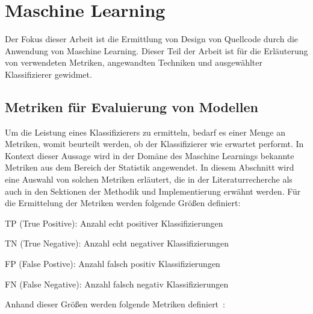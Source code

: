 \section{Maschine Learning}

Der Fokus dieser Arbeit ist die Ermittlung von Design von Quellcode durch die Anwendung von Maschine Learning.
Dieser Teil der Arbeit ist für die Erläuterung von verwendeten Metriken, angewandten Techniken und ausgewählter Klassifizierer gewidmet.

\subsection{Metriken für Evaluierung von Modellen}\label{metrics}

Um die Leistung eines Klassifizierers zu ermitteln, bedarf es einer Menge an Metriken, womit beurteilt werden, ob der Klassifizierer wie erwartet performt.
In Kontext dieser Aussage wird in der Domäne des Maschine Learnings bekannte Metriken aus dem Bereich der Statistik angewendet.
In diesem Abschnitt wird eine Auswahl von solchen Metriken erläutert, die in der Literaturrecherche als auch in den Sektionen der Methodik und Implementierung erwähnt werden.
Für die Ermittelung der Metriken werden folgende Größen definiert:

\begin{description}
    \item TP (True Positive): Anzahl echt positiver Klassifizierungen
    \item TN (True Negative): Anzahl echt negativer Klassifizierungen
    \item FP (False Postive): Anzahl falsch positiv Klassifizierungen
    \item FN (False Negative): Anzahl falsch negativ Klassifizierungen
\end{description}

Anhand dieser Größen werden folgende Metriken definiert~\cite[S. 3]{doi:10.1148/ryai.2021200126}:

